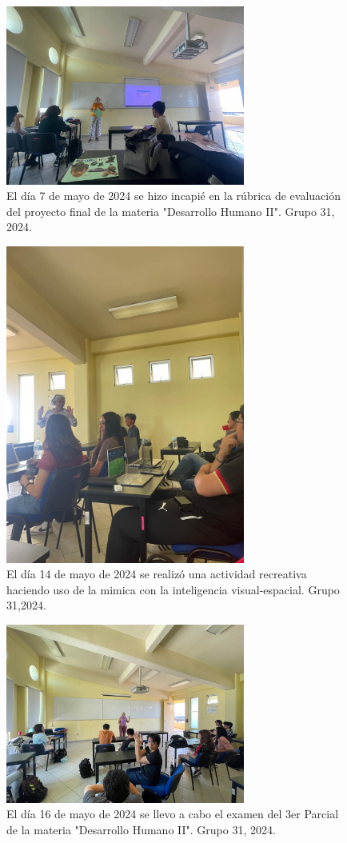 \begin{figure}
    \caption{El día 7 de mayo de 2024 se hizo incapié en la rúbrica de evaluación del proyecto final de la materia "Desarrollo Humano II". Grupo 31, 2024.\label{fig:No.4}}
    \includegraphics[width=0.7\textwidth]{./assets/img/imagen4DH.jpeg}
\end{figure}

\begin{figure}
    \caption{El día  14 de mayo de 2024 se realizó una actividad recreativa haciendo uso de la mimica con la inteligencia visual-espacial. Grupo 31,2024.\label{fig:No.5}}
    \includegraphics[width=0.7\textwidth]{./assets/img/imagen5DH.jpeg}
\end{figure}

\begin{figure}
    \caption{El día 16 de mayo de 2024 se llevo a cabo el examen del 3er Parcial de la materia "Desarrollo Humano II". Grupo 31, 2024.\label{fig:No.6}}
    \includegraphics[width=0.7\textwidth]{./assets/img/imagen6DH.jpeg}
\end{figure}
